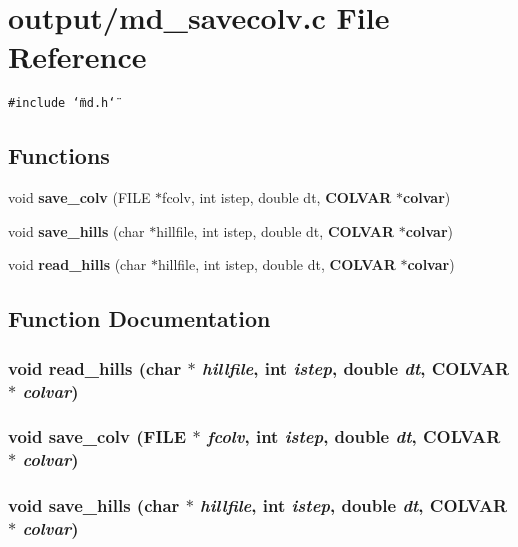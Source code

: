 \section{output/md\_\-savecolv.c File Reference}
\label{md__savecolv_8c}
{\tt \#include \char`\"{}md.h\char`\"{}}\par
\subsection*{Functions}
\begin{CompactItemize}
\item 
void {\bf save\_\-colv} (FILE $\ast$fcolv, int istep, double dt, {\bf COLVAR} $\ast${\bf colvar})
\item 
void {\bf save\_\-hills} (char $\ast$hillfile, int istep, double dt, {\bf COLVAR} $\ast${\bf colvar})
\item 
void {\bf read\_\-hills} (char $\ast$hillfile, int istep, double dt, {\bf COLVAR} $\ast${\bf colvar})
\end{CompactItemize}


\subsection{Function Documentation}
\subsubsection{\setlength{\rightskip}{0pt plus 5cm}void read\_\-hills (char $\ast$ {\em hillfile}, int {\em istep}, double {\em dt}, {\bf COLVAR} $\ast$ {\em colvar})}\label{md__savecolv_8c_8e393b90678e169ee19a52da44dc7751}


\subsubsection{\setlength{\rightskip}{0pt plus 5cm}void save\_\-colv (FILE $\ast$ {\em fcolv}, int {\em istep}, double {\em dt}, {\bf COLVAR} $\ast$ {\em colvar})}\label{md__savecolv_8c_ff2ccfb457bffeaf8c264bde0763917f}


\subsubsection{\setlength{\rightskip}{0pt plus 5cm}void save\_\-hills (char $\ast$ {\em hillfile}, int {\em istep}, double {\em dt}, {\bf COLVAR} $\ast$ {\em colvar})}\label{md__savecolv_8c_6a8f9e2f0008b1f4a0f75342aaf1b463}


